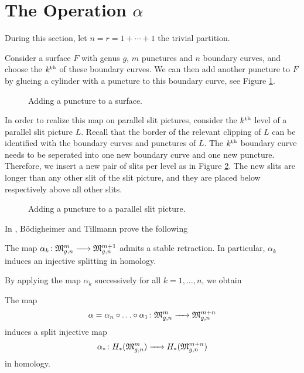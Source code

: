 \section{The Operation \texorpdfstring{$\alpha$}{alpha}}
\label{homology_operations:alpha}
During this section, let $n = r = 1 + \dotsb + 1$ the trivial partition.

Consider a surface $F$ with genus $g$, $m$ punctures and $n$ boundary curves, and choose the $k^{\text{th}}$ of these boundary curves. 
We can then add another puncture to $F$ by glueing a cylinder with a puncture to this boundary curve,
see Figure \ref{map_A_on_surfaces}.

\begin{figure}[ht]
\centering
\def\svgwidth{0.3\columnwidth}

\caption{\label{map_A_on_surfaces} Adding a puncture to a surface.}
\end{figure}

In order to realize this map on parallel slit pictures, consider the $k^{\text{th}}$ level of a parallel slit picture $L$.
Recall that the border of the relevant clipping of $L$ can be identified with the boundary curves and punctures of $L$. 
The $k^{\text{th}}$ boundary curve needs to be seperated into one new boundary curve and one new puncture.
Therefore, we insert a new pair of slits per level as in Figure \ref{map_A_on_cells}.
The new slits are longer than any other slit of the slit picture, and they are placed below respectively above all other slits.

\begin{figure}[ht]
\centering
{}
\caption{\label{map_A_on_cells} Adding a puncture to a parallel slit picture.}
\end{figure}

In \cite[Theorem 1.3]{BoedigheimerTillmann2001}, Bödigheimer and Tillmann prove the following

\begin{thm}
   The map $\alpha_k \colon \mathfrak{M}^m_{g,n} \xrightarrow{\hspace{6pt}{}\hspace{6pt}} \mathfrak{M}^{m+1}_{g,n}$ admits a stable retraction.
   In particular, $\alpha_k$ induces an injective splitting in homology.
\end{thm}

By applying the map $\alpha_k$ successively for all $k = 1, \dotsc, n$, we obtain 

\begin{defprop}
\label{alpha}
The map
\[
   \alpha = \alpha_n \circ \dotsc \circ \alpha_1 \colon \mathfrak{M}^m_{g,n} \xrightarrow{\hspace{6pt}{}\hspace{6pt}} \mathfrak{M}^{m+n}_{g,n}
\]
induces a split injective map
\[
   \alpha_* \colon H_*(\mathfrak{M}^m_{g,n}) \xrightarrow{\hspace{6pt}{}\hspace{6pt}} H_*(\mathfrak{M}^{m+n}_{g,n})
\]
in homology.
\end{defprop}

